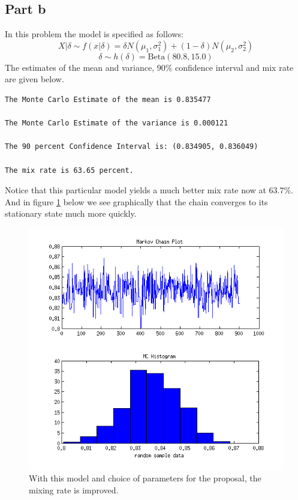 \documentclass[12pt,a4paper]{article}
\begin{document}
\subsection*{Part b}
In this problem the model is specified as follows:
\[X|\delta\sim f(x|\delta)=\delta N(\mu_1,\sigma_1^2)+(1-\delta)N(\mu_2,\sigma_2^2)\]
\[\delta\sim h(\delta)=\text{Beta}(80.8,15.0)\]
The estimates of the mean and variance, $90\%$ confidence interval and mix rate are given below.
\begin{verbatim}
The Monte Carlo Estimate of the mean is 0.835477

The Monte Carlo Estimate of the variance is 0.000121

The 90 percent Confidence Interval is: (0.834905, 0.836049)

The mix rate is 63.65 percent.
\end{verbatim}
Notice that this particular model yields a much better mix rate now at $63.7\%$. And in figure \ref{q1fig2} below we see graphically that the chain converges to its stationary state much more quickly. 

\begin{figure}[ht!] 
\begin{center}
\includegraphics[scale=.7]{q1graph2.png}
\caption{With this model and choice of parameters for the proposal, the mixing rate is improved.}
\label{q1fig2}
\end{center}
\end{figure}
\FloatBarrier
\end{document}
